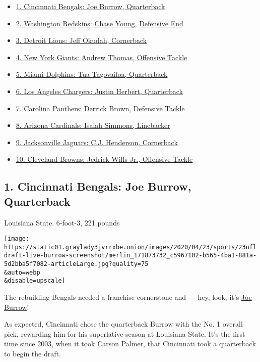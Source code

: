 \begin{itemize}
\tightlist
\item
  \protect\hyperlink{link-9c6317c}{1. Cincinnati Bengals: Joe Burrow,
  Quarterback}
\item
  \protect\hyperlink{link-78370c67}{2. Washington Redskins: Chase Young,
  Defensive End}
\item
  \protect\hyperlink{link-349a0dbb}{3. Detroit Lions: Jeff Okudah,
  Cornerback}
\item
  \protect\hyperlink{link-76d0d77d}{4. New York Giants: Andrew Thomas,
  Offensive Tackle}
\item
  \protect\hyperlink{link-1311ed4c}{5. Miami Dolphins: Tua Tagovailoa,
  Quarterback}
\item
  \protect\hyperlink{link-1f4f47de}{6. Los Angeles Chargers: Justin
  Herbert, Quarterback}
\item
  \protect\hyperlink{link-78d7c085}{7. Carolina Panthers: Derrick Brown,
  Defensive Tackle}
\item
  \protect\hyperlink{link-20b7c286}{8. Arizona Cardinals: Isaiah
  Simmons, Linebacker}
\item
  \protect\hyperlink{link-6d4fa1b7}{9. Jacksonville Jaguars: C.J.
  Henderson, Cornerback}
\item
  \protect\hyperlink{link-13d30fd9}{10. Cleveland Browns: Jedrick Wills
  Jr., Offensive Tackle}
\end{itemize}

\hypertarget{1-cincinnati-bengals-joe-burrow-quarterback}{%
\subsection{1. Cincinnati Bengals: Joe Burrow,
Quarterback}\label{1-cincinnati-bengals-joe-burrow-quarterback}}

Louisiana State. 6-foot-3, 221 pounds

\texttt{[image: https://static01.graylady3jvrrxbe.onion/images/2020/04/23/sports/23nfldraft-live-burrow-screenshot/merlin\_171873732\_c5967102-b565-4ba1-881a-5d2bba5f7082-articleLarge.jpg?quality=75\\\&auto=webp\\\&disable=upscale]}

The rebuilding Bengals needed a franchise cornerstone and --- hey, look,
it's
\href{https://www.nytimes3xbfgragh.onion/article/joe-burrow-nfl-draft.html}{Joe
Burrow}!

As expected, Cincinnati chose the quarterback Burrow with the No. 1
overall pick, rewarding him for his superlative season at Louisiana
State. It's the first time since 2003, when it took Carson Palmer, that
Cincinnati took a quarterback to begin the draft.


